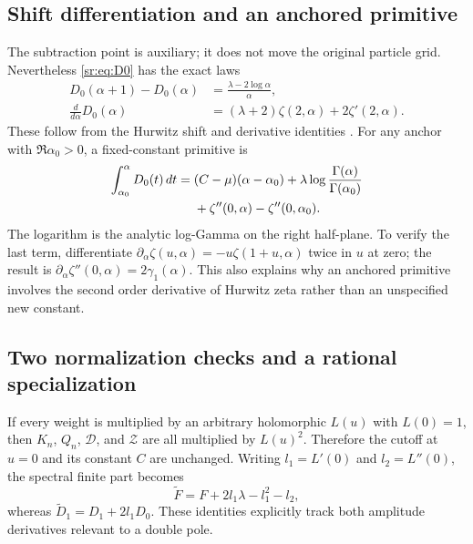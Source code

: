 \subsection{Shift differentiation and an anchored primitive}
The subtraction point is auxiliary; it does not move the original
particle grid. Nevertheless \eqref{sr:eq:D0} has the exact laws
\begin{align}
 D_0(\alpha+1)-D_0(\alpha)
 &=\frac{\lambda-2\log\alpha}{\alpha},\label{sr:eq:alpha-shift}\\
 \frac{d}{d\alpha}D_0(\alpha)
 &=(\lambda+2)\zeta(2,\alpha)+2\zeta'(2,\alpha).
 \label{sr:eq:alpha-derivative}
\end{align}
These follow from the Hurwitz shift and derivative identities
\cite[25.11.3 and 25.11.17]{dlmf-hurwitz}. For any anchor with
$\Re\alpha_0>0$, a fixed-constant primitive is
\begin{align}
 \int_{\alpha_0}^{\alpha}D_0(t)\,dt
 ={}&(C-\mu)(\alpha-\alpha_0)
 +\lambda\log\frac{\Gamma(\alpha)}{\Gamma(\alpha_0)}\notag\\
 &+\zeta''(0,\alpha)-\zeta''(0,\alpha_0).
 \label{sr:eq:primitive}
\end{align}
The logarithm is the analytic log-Gamma on the right half-plane.
To verify the last term, differentiate
$\partial_\alpha\zeta(u,\alpha)=-u\zeta(1+u,\alpha)$ twice in
$u$ at zero; the result is
$\partial_\alpha\zeta''(0,\alpha)=2\gamma_1(\alpha)$.
This also explains why an anchored primitive involves the second
order derivative of Hurwitz zeta rather than an unspecified new constant.

\subsection{Two normalization checks and a rational specialization}
If every weight is multiplied by an arbitrary holomorphic $L(u)$
with $L(0)=1$, then $K_n$, $Q_n$, $\mathcal D$, and $\mathcal Z$
are all multiplied by $L(u)^2$. Therefore the cutoff at $u=0$ and
its constant $C$ are unchanged. Writing $l_1=L'(0)$ and
$l_2=L''(0)$, the spectral finite part becomes
\begin{equation}\label{sr:eq:normalization}
 \widetilde F=F+2l_1\lambda-l_1^2-l_2,
\end{equation}
whereas $\widetilde D_1=D_1+2l_1D_0$. These identities explicitly
track both amplitude derivatives relevant to a double pole.

